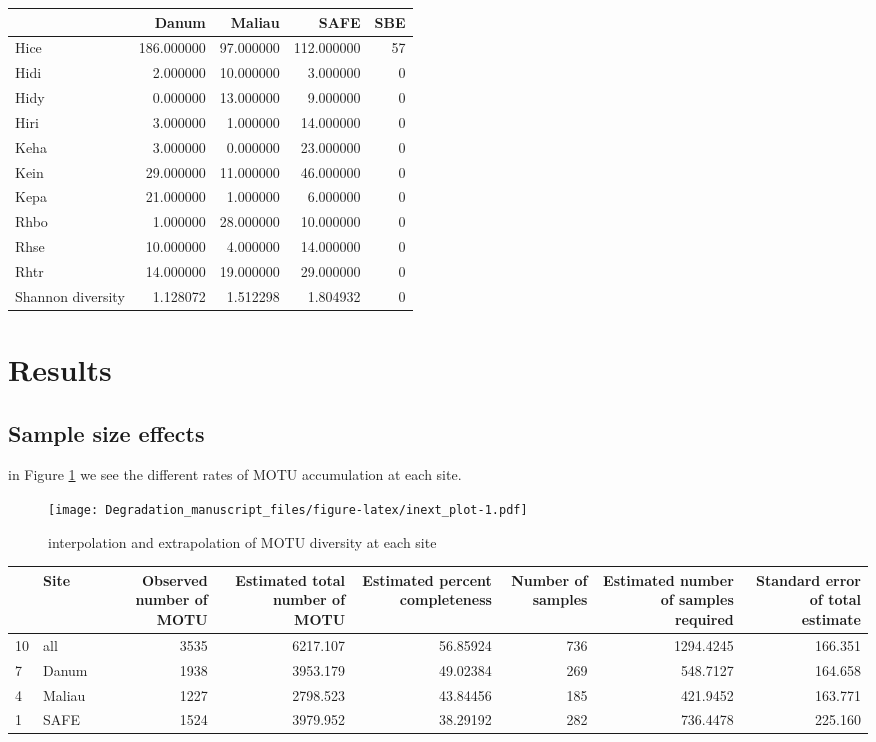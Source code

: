 \documentclass[]{article}
\begin{document}
\begin{table}[H]
\centering
\begin{tabular}{l|r|r|r|r}
\hline
  & Danum & Maliau & SAFE & SBE\\
\hline
Hice & 186.000000 & 97.000000 & 112.000000 & 57\\
\hline
Hidi & 2.000000 & 10.000000 & 3.000000 & 0\\
\hline
Hidy & 0.000000 & 13.000000 & 9.000000 & 0\\
\hline
Hiri & 3.000000 & 1.000000 & 14.000000 & 0\\
\hline
Keha & 3.000000 & 0.000000 & 23.000000 & 0\\
\hline
Kein & 29.000000 & 11.000000 & 46.000000 & 0\\
\hline
Kepa & 21.000000 & 1.000000 & 6.000000 & 0\\
\hline
Rhbo & 1.000000 & 28.000000 & 10.000000 & 0\\
\hline
Rhse & 10.000000 & 4.000000 & 14.000000 & 0\\
\hline
Rhtr & 14.000000 & 19.000000 & 29.000000 & 0\\
\hline
Shannon diversity & 1.128072 & 1.512298 & 1.804932 & 0\\
\hline
\end{tabular}
\end{table}

\section{Results}\label{results}

\subsection{Sample size effects}\label{sample-size-effects}

in Figure \ref{fig:inext} we see the different rates of MOTU
accumulation at each site.

\begin{figure}
\centering
\texttt{[image: Degradation\_manuscript\_files/figure-latex/inext\_plot-1.pdf]}
\caption{\label{fig:inext}interpolation and extrapolation of MOTU
diversity at each site}
\end{figure}

\begin{table}[H]
\centering
\begin{tabular}{l|l|r|r|r|r|r|r}
\hline
  & Site & Observed number of MOTU & Estimated total number of MOTU & Estimated percent completeness & Number of samples & Estimated number of samples required & Standard error of total estimate\\
\hline
10 & all & 3535 & 6217.107 & 56.85924 & 736 & 1294.4245 & 166.351\\
\hline
7 & Danum & 1938 & 3953.179 & 49.02384 & 269 & 548.7127 & 164.658\\
\hline
4 & Maliau & 1227 & 2798.523 & 43.84456 & 185 & 421.9452 & 163.771\\
\hline
1 & SAFE & 1524 & 3979.952 & 38.29192 & 282 & 736.4478 & 225.160\\
\hline
\end{tabular}
\end{table}
\end{document}
